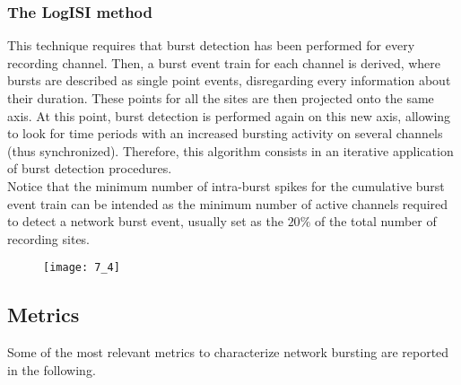 \subsubsection{The LogISI method}
This technique requires that burst detection has been performed for every
recording channel. Then, a burst event train for each channel is derived, where
bursts are described as single point events, disregarding every information about
their duration. These points for all the sites are then projected onto the same axis.
At this point, burst detection is performed again on this new axis, allowing
to look for time periods with an increased bursting activity on several channels (thus
synchronized). Therefore, this algorithm consists in an iterative application of burst
detection procedures.\\
Notice that the minimum number of intra-burst spikes for the cumulative
burst event train can be intended as the minimum number of active channels required
to detect a network burst event, usually set as the \(20\%\) of the total number of
recording sites.
\begin{figure}[H]
    \texttt{[image: 7\_4]}
    \centering
\end{figure}

\subsection{Metrics}
Some of the most relevant metrics to characterize network bursting are reported
in the following.
